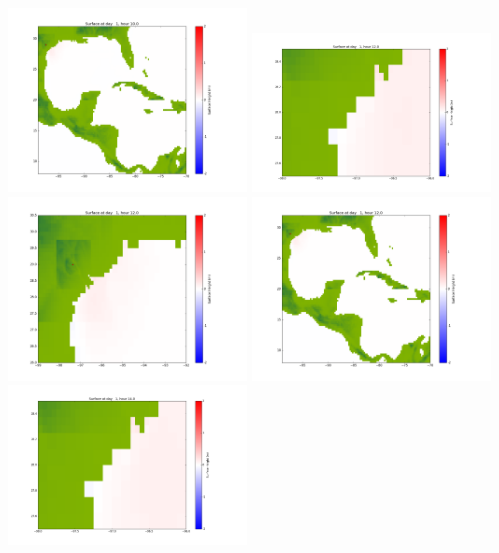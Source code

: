 \documentclass[11pt]{article}
\begin{document}
\vskip 10pt 
\includegraphics[width=0.475\textwidth]{frame0041fig1003.png}
\vskip 10pt 
\includegraphics[width=0.475\textwidth]{frame0042fig1001.png}
\includegraphics[width=0.475\textwidth]{frame0042fig1002.png}
\vskip 10pt 
\includegraphics[width=0.475\textwidth]{frame0042fig1003.png}
\vskip 10pt 
\includegraphics[width=0.475\textwidth]{frame0043fig1001.png}
\end{document}
